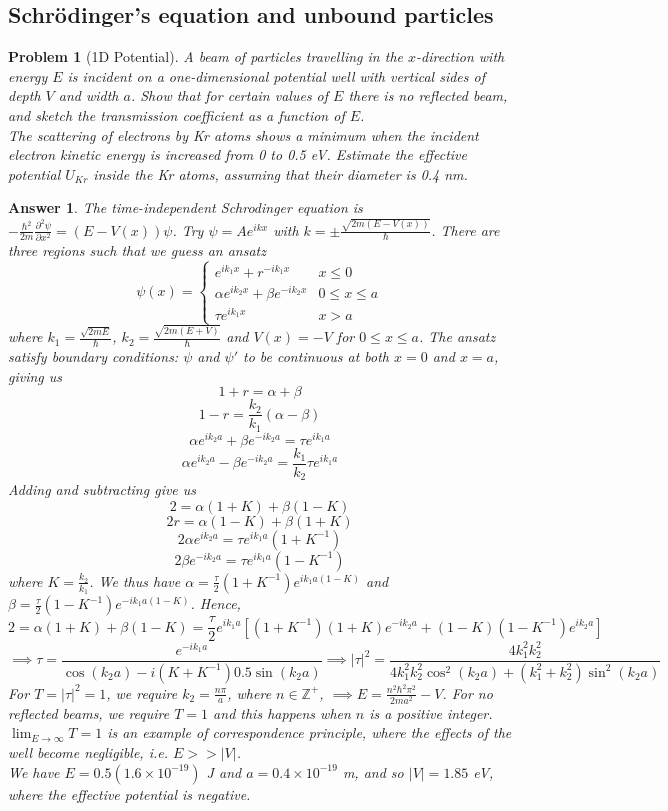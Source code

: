 \documentclass[a4paper]{article}
\newtheorem{ans}{Answer}[section]
\theoremstyle{new}
\newtheorem{qns}{Problem}[section]
\begin{document}
\subsection*{Schr\"{o}dinger's equation and unbound particles}
\begin{qns}[1D Potential]
A beam of particles travelling in the $x$-direction with energy $E$ is incident on a one-dimensional potential well with vertical sides of depth $V$ and width $a$. Show that for certain values of $E$ there is no reflected beam, and sketch the transmission coefficient as a function of $E$.\\[5pt]
The scattering of electrons by Kr atoms shows a minimum when the incident electron kinetic energy is increased from 0 to 0.5 eV. Estimate the effective potential $U_{Kr}$ inside the Kr atoms, assuming that their diameter is 0.4 nm.
\end{qns}
\begin{ans}
The time-independent Schrodinger equation is $-\frac{\hbar^2}{2m}\frac{\partial^2\psi}{\partial x^2}=(E-V(x))\psi$. Try $\psi=Ae^{ikx}$ with $k=\pm\frac{\sqrt{2m(E-V(x))}}{\hbar}$. There are three regions such that we guess an ansatz 
$$\psi(x)=
\left\{
        \begin{array}{ll}
      e^{ik_1x}+r^{-ik_1x} & x\leq 0 \\
     \alpha e^{ik_2x}+\beta e^{-ik_2x}& 0\leq x\leq a\\
     \tau e^{ik_1x} & x>a
        \end{array}
    \right.$$
where $k_1=\frac{\sqrt{2mE}}{\hbar}$, $k_2=\frac{\sqrt{2m(E+V)}}{\hbar}$ and $V(x)=-V$ for $0\leq x\leq a$. The ansatz satisfy boundary conditions: $\psi$ and $\psi'$ to be continuous at both $x=0$ and $x=a$, giving us
$$1+r=\alpha+\beta$$
$$1-r=\frac{k_2}{k_1}(\alpha-\beta)$$
$$\alpha e^{ik_2a}+\beta e^{-ik_2a}=\tau e^{ik_1a}$$
$$\alpha e^{ik_2a}-\beta e^{-ik_2a}=\frac{k_1}{k_2}\tau e^{ik_1a}$$
Adding and subtracting give us $$2=\alpha(1+K)+\beta(1-K)$$ $$2r=\alpha(1-K)+\beta(1+K)$$ $$2\alpha e^{ik_2a}=\tau e^{ik_1a}(1+K^{-1})$$
$$2\beta e^{-ik_2a}=\tau e^{ik_1a}(1-K^{-1})$$
where $K=\frac{k_2}{k_1}$. We thus have $\alpha=\frac{\tau}{2}(1+K^{-1})e^{ik_1a(1-K)}$ and $\beta=\frac{\tau}{2}(1-K^{-1})e^{-ik_1a(1-K)}$. Hence,
$$2=\alpha(1+K)+\beta(1-K)=\frac{\tau}{2}e^{ik_1a}[(1+K^{-1})(1+K)e^{-ik_2a}+(1-K)(1-K^{-1})e^{ik_2a}]$$
$$\implies\tau=\frac{e^{-ik_1a}}{\cos(k_2a)-i(K+K^{-1})0.5\sin(k_2a)}\implies|\tau|^2=\frac{4k_1^2k_2^2}{4k_1^2k_2^2\cos^2(k_2a)+(k_1^2+k_2^2)\sin^2(k_2a)}$$
For $T=|\tau|^2=1$, we require $k_2=\frac{n\pi}{a}$, where $n\in\mathbb{Z}^+$, $\implies E=\frac{n^2\hbar^2\pi^2}{2ma^2}-V$. For no reflected beams, we require $T=1$ and this happens when $n$ is a positive integer. $\lim_{E\rightarrow\infty}T=1$ is an example of correspondence principle, where the effects of the well become negligible, i.e. $E>>|V|$.\\[5pt]
We have $E=0.5(1.6\times10^{-19})$ J and $a=0.4\times10^{-19}$ m, and so $|V|=1.85$ eV, where the effective potential is negative.
\end{ans}
\newpage
\end{document}
